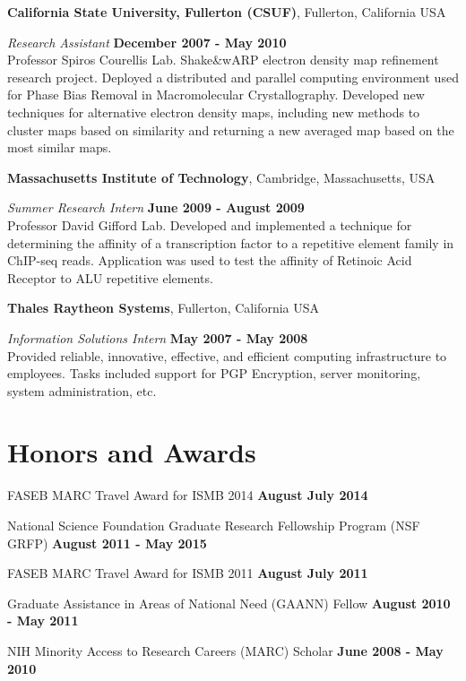 \documentclass[margin,line]{res}
\begin{document}
\begin{resume}
{\bf California State University, Fullerton (CSUF)}, Fullerton, California USA
\vspace{-.3cm}

{\em Research Assistant} \hfill {\bf December 2007 - May 2010}\\
Professor Spiros Courellis Lab. Shake\&wARP electron density map refinement
research project. Deployed a distributed and parallel computing environment used
for Phase Bias Removal in Macromolecular Crystallography. Developed new
techniques for alternative electron density maps, including new methods to
cluster maps based on similarity and returning a new averaged map based on the
most similar maps.

\newpage

{\bf Massachusetts Institute of Technology}, Cambridge, Massachusetts,
USA 

\vspace{-.3cm}
{\em Summer Research Intern} \hfill {\bf June 2009 - August 2009}\\
Professor David Gifford Lab. Developed and implemented a technique for
determining the affinity of a transcription factor to a repetitive element
family in ChIP-seq reads. Application was used to test the affinity of Retinoic
Acid Receptor to ALU repetitive elements.

{\bf Thales Raytheon Systems}, Fullerton, California USA

\vspace{-.3cm}
{\em Information Solutions Intern} \hfill {\bf May 2007 - May 2008}\\
Provided reliable, innovative, effective, and efficient computing infrastructure
to employees. Tasks included support for PGP Encryption, server monitoring,
system administration, etc.


\section{\sc Honors and Awards}
FASEB MARC Travel Award for ISMB 2014 \hfill {\bf August
  July 2014}

National Science Foundation Graduate Research Fellowship Program (NSF GRFP)
\hfill {\bf August 2011 - May 2015}

FASEB MARC Travel Award for ISMB 2011 \hfill {\bf August
  July 2011}

Graduate Assistance in Areas of National Need (GAANN) Fellow \hfill {\bf August
  2010 - May 2011}

NIH Minority Access to Research Careers (MARC) Scholar \hfill {\bf
  June 2008 - May 2010} 


\end{resume}
\end{document}
